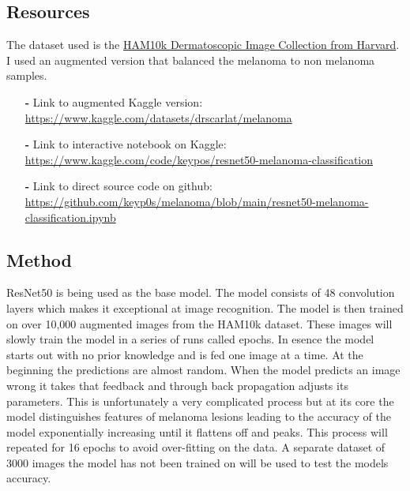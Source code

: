 \documentclass{article}
\begin{document}
\subsection*{Resources}
\raggedright The dataset used is the \href{https://www.nature.com/articles/sdata2018161}{HAM10k Dermatoscopic Image Collection from Harvard}. I used an augmented version that balanced the melanoma to non melanoma samples.
\linebreak

\begin{itemize}
\item[\textbf{-}] Link to augmented Kaggle version: \linebreak
\href{https://www.kaggle.com/datasets/drscarlat/melanoma}{https://www.kaggle.com/datasets/drscarlat/melanoma}
\linebreak

\item[\textbf{-}] Link to interactive notebook on Kaggle: \linebreak \href{https://www.kaggle.com/code/keypos/resnet50-melanoma-classification}{https://www.kaggle.com/code/keypos/resnet50-melanoma-classification}
\linebreak 

\item[\textbf{-}] Link to direct source code on github: \linebreak
\href{https://github.com/keyp0s/melanoma/blob/main/resnet50-melanoma-classification.ipynb}{https://github.com/keyp0s/melanoma/blob/main/resnet50-melanoma-classification.ipynb}
\end{itemize}

\subsection*{Method}
ResNet50 is being used as the base model. The model consists of 48 convolution layers which makes it exceptional at image recognition. The model is then trained on over 10,000 augmented images from the HAM10k dataset. These images will slowly train the model in a series of runs called epochs. In esence the model starts out with no prior knowledge and is fed one image at a time. At the beginning the predictions are almost random. When the model predicts an image wrong it takes that feedback and through back propagation adjusts its parameters. This is unfortunately a very complicated process  but at its core the model distinguishes features of melanoma lesions leading to the accuracy of the model exponentially increasing until it flattens off and peaks. This process will repeated for 16 epochs to avoid over-fitting on the data. A separate dataset of 3000 images the model has not been trained on will be used to test the models accuracy.
\linebreak
\end{document}
